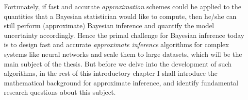Fortunately, if fast and accurate \emph{approximation} schemes could be applied to the quantities that a Bayesian statistician would like to compute, then he/she can still perform (approximate) Bayesian inference and quantify the model uncertainty accordingly. Hence the primal challenge for Bayesian inference today is to design fast and accurate \emph{approximate inference} algorithms for complex systems like neural networks and scale them to large datasets, which will be the main subject of the thesis. But before we delve into the development of such algorithms, in the rest of this introductory chapter I shall introduce the mathematical background for approximate inference, and identify fundamental research questions about this subject.


